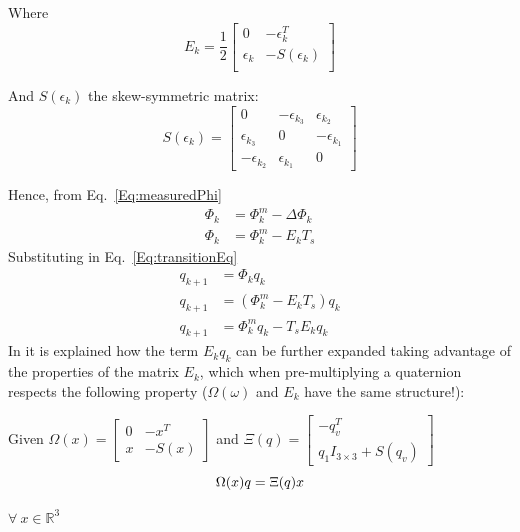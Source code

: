 \documentclass[a4paper,10pt]{article}
\begin{document}
  Where 
  \begin{equation}
  E_k = \frac{1}{2}\left[ \begin{array}{cc}
                           0      & -\epsilon^T_k  \\
                           \epsilon_k & -S(\epsilon_k) \\
                          \end{array}  \right]
  \end{equation}
  
  And $S(\epsilon_k)$ the skew-symmetric matrix:
  \begin{equation}
    S(\epsilon_k) = \left[ \begin{array}{ccc}
                                0       &  -\epsilon_{k_3} & \epsilon_{k_2}  \\
                          \epsilon_{k_3}  &        0       & -\epsilon_{k_1} \\
                          -\epsilon_{k_2} &   \epsilon_{k_1} &       0       
                         \end{array} \right]
  \end{equation}
  
  Hence, from Eq.~\ref{Eq:measuredPhi}
  \begin{align}
   \Phi_k &= \Phi^m_k - \Delta \Phi_k \\
   \Phi_k &= \Phi^m_k - E_k T_s
  \end{align}
  Substituting in Eq.~\ref{Eq:transitionEq}
  \begin{align}
   q_{k+1} &= \Phi_k q_k \\
   q_{k+1} &= (\Phi^m_k - E_k T_s)q_k \\
   q_{k+1} &= \Phi^m_k q_k - T_s E_k q_k \label{Eq:transitionEq2}
  \end{align}
  In \cite{Choukroun2003} it is explained how the term $E_k q_k$ can be further expanded taking advantage of the properties of the matrix $E_k$, which when pre-multiplying a quaternion respects the following property ($\Omega(\omega)$ and $E_k$ have the same structure!):
  
  \begin{tcolorbox}
   Given $\Omega(x) = \left[\begin{array}{cc}
                               0   & -x^T \\
                               x   & -S(x)
                            \end{array}\right]$
  and $\Xi(q) = \left[\begin{array}{c}
                   -q^T_v \\
                   q_1 I_{3\times3} + S(q_v)
                 \end{array}\right]$ \newline
    \begin{equation}
     \centering
     \Omega(x)q = \Xi(q)x
     \label{Eq:propertyXi}
    \end{equation}
    \begin{center}
      $\forall~x \in \mathbb{R}^3$
    \end{center}
  \end{tcolorbox}
\end{document}
